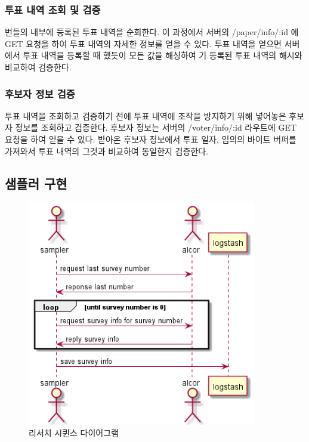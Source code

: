 \documentclass[8pt,a4paper,left=8mm,right=8mm,top=10mm,bottom=10mm]{article}
\begin{document}
    \subsubsection{투표 내역 조회 및 검증}

    번들의 내부에 등록된 투표 내역을 순회한다. 이 과정에서 서버의 /paper/info/:id 에 GET 요청을 하여 투표 내역의 자세한 정보를 얻을 수 있다. 투표 내역을 얻으면 서버에서 투표 내역을 등록할 때 했듯이 모든 값을 해싱하여 기 등록된 투표 내역의 해시와 비교하여 검증한다.

    \subsubsection{후보자 정보 검증}

    투표 내역을 조회하고 검증하기 전에 투표 내역에 조작을 방지하기 위해 넣어놓은 후보자 정보를 조회하고 검증한다. 후보자 정보는 서버의 /voter/info/:id 라우트에 GET 요청을 하여 얻을 수 있다. 받아온 후보자 정보에서 투표 일자, 임의의 바이트 버퍼를 가져와서 투표 내역의 그것과 비교하여 동일한지 검증한다. 

\subsection{샘플러 구현}

    \begin{figure}[h]
        \begin{center}
            \includegraphics[width=10cm]{researcher-seq}
            \caption{리서치 시퀸스 다이어그램}
        \end{center}
    \end{figure}
\end{document}
